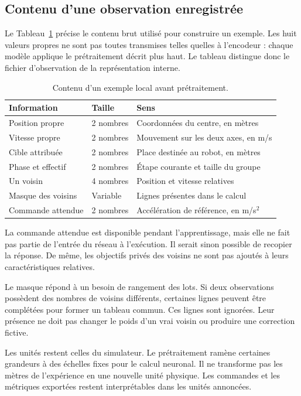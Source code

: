\subsection{Contenu d'une observation enregistrée}
Le Tableau~\ref{tab:observation-fichier} précise le contenu brut utilisé pour construire un exemple. Les huit valeurs propres ne sont pas toutes transmises telles quelles à l'encodeur : chaque modèle applique le prétraitement décrit plus haut. Le tableau distingue donc le fichier d'observation de la représentation interne.
\begin{table}[htbp]
\caption{Contenu d'un exemple local avant prétraitement.}
\label{tab:observation-fichier}
\centering
\begin{tabularx}{\textwidth}{p{3.5cm}p{2cm}X}
\toprule
Information & Taille & Sens\\\midrule
Position propre & 2 nombres & Coordonnées du centre, en mètres\\
Vitesse propre & 2 nombres & Mouvement sur les deux axes, en m/s\\
Cible attribuée & 2 nombres & Place destinée au robot, en mètres\\
Phase et effectif & 2 nombres & Étape courante et taille du groupe\\
Un voisin & 4 nombres & Position et vitesse relatives\\
Masque des voisins & Variable & Lignes présentes dans le calcul\\
Commande attendue & 2 nombres & Accélération de référence, en m/s$^2$\\\bottomrule
\end{tabularx}
\end{table}

La commande attendue est disponible pendant l'apprentissage, mais elle ne fait pas partie de l'entrée du réseau à l'exécution. Il serait sinon possible de recopier la réponse. De même, les objectifs privés des voisins ne sont pas ajoutés à leurs caractéristiques relatives.

Le masque répond à un besoin de rangement des lots. Si deux observations possèdent des nombres de voisins différents, certaines lignes peuvent être complétées pour former un tableau commun. Ces lignes sont ignorées. Leur présence ne doit pas changer le poids d'un vrai voisin ou produire une correction fictive.

Les unités restent celles du simulateur. Le prétraitement ramène certaines grandeurs à des échelles fixes pour le calcul neuronal. Il ne transforme pas les mètres de l'expérience en une nouvelle unité physique. Les commandes et les métriques exportées restent interprétables dans les unités annoncées.

